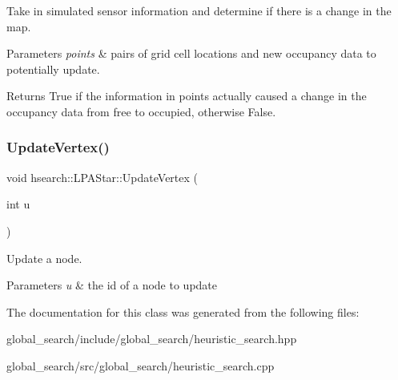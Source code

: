 Take in simulated sensor information and determine if there is a change in the map. 


\begin{DoxyParams}{Parameters}
{\em points} & pairs of grid cell locations and new occupancy data to potentially update. \\
\hline
\end{DoxyParams}
\begin{DoxyReturn}{Returns}
True if the information in points actually caused a change in the occupancy data from free to occupied, otherwise False. 
\end{DoxyReturn}
\mbox{\label{classhsearch_1_1LPAStar_a41219de9a23ffe245589dc34a35e0639}} 
\subsubsection{\texorpdfstring{Update\+Vertex()}{UpdateVertex()}}
{\footnotesize\ttfamily void hsearch\+::\+L\+P\+A\+Star\+::\+Update\+Vertex (\begin{DoxyParamCaption}\item[{int}]{u }\end{DoxyParamCaption})\hspace{0.3cm}{\ttfamily [protected]}}



Update a node. 


\begin{DoxyParams}{Parameters}
{\em u} & the id of a node to update \\
\hline
\end{DoxyParams}


The documentation for this class was generated from the following files\+:\begin{DoxyCompactItemize}
\item 
global\+\_\+search/include/global\+\_\+search/heuristic\+\_\+search.\+hpp\item 
global\+\_\+search/src/global\+\_\+search/heuristic\+\_\+search.\+cpp\end{DoxyCompactItemize}
